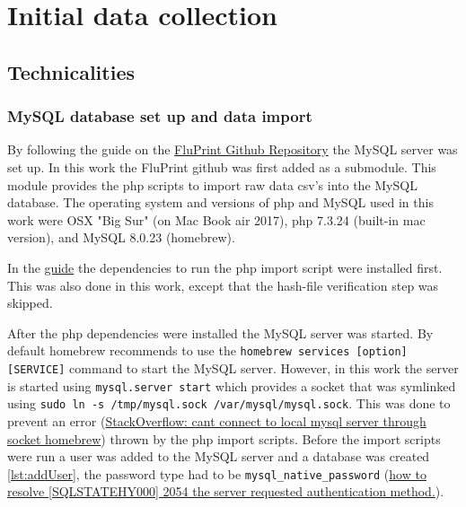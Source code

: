 

\makeglossaries





\tableofcontents
\printglossary[type=bus]
\printglossary[type=dm]
\printglossary[type=\acronymtype]

\section{Initial data collection}

\subsection{Technicalities}

\subsubsection{MySQL database set up and data import}

By following the guide on the
\href{https://github.com/LogIN-/fluprint}{FluPrint Github Repository} the MySQL
server was set up. In this work the FluPrint github was first added as a
submodule. This module provides the php scripts to import raw data csv's into
the MySQL database. The operating system and versions of php and MySQL used in
this work were OSX "Big Sur" (on Mac Book air 2017), php 7.3.24 (built-in mac
version), and MySQL 8.0.23 (homebrew).

In the \href{https://github.com/LogIN-/fluprint}{guide} the dependencies to run
the php import script were installed first. This was also done in this work,
except that the hash-file verification step was skipped.

After the php dependencies were installed the MySQL server was started. By
default homebrew recommends to use the \lstinline{homebrew services [option] [SERVICE]} command to start the MySQL server. However, in this work the server
is started using \lstinline{mysql.server start} which provides a socket that
was symlinked using \lstinline{sudo ln -s /tmp/mysql.sock /var/mysql/mysql.sock}. This was done to prevent an error
(\href{https://stackoverflow.com/questions/15016376/cant-connect-to-local-mysql-server-through-socket-homebrew/18090173}{StackOverflow: cant connect to local mysql server through socket homebrew}) thrown
by the php import scripts. Before the import scripts were run a user was added to the
MySQL server and a database was created \ref{lst:addUser}, the password type had to be \lstinline{mysql_native_password}
(\href{https://stackoverflow.com/questions/62873680/how-to-resolve-sqlstatehy000-2054-the-server-requested-authentication-metho}{how to resolve [SQLSTATEHY000] 2054 the server requested authentication method.}).


